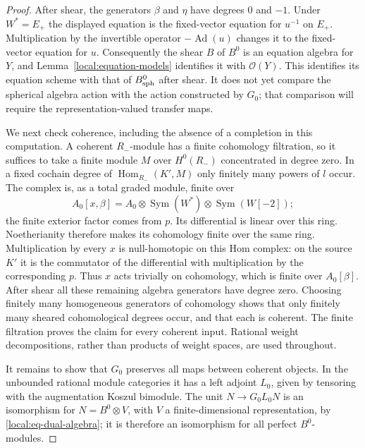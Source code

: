 \documentclass[11pt]{article}
\numberwithin{equation}{section}
\theoremstyle{definition}
\theoremstyle{remark}
\newcommand{\cO}{\mathcal O}
\newcommand{\Ad}{\operatorname{Ad}}
\newcommand{\Hom}{\operatorname{Hom}}
\newcommand{\Sym}{\operatorname{Sym}}
\begin{document}
\begin{proof}
After shear, the generators $\beta$ and $\eta$ have degrees $0$ and
$-1$.  Under $W^*=E_+$ the displayed equation is the fixed-vector
equation for $u^{-1}$ on $E_+$.  Multiplication by the invertible
operator $-\Ad(u)$ changes it to the fixed-vector equation for $u$.
Consequently the shear $B$ of $B^0$ is an equation algebra for $Y$,
and Lemma~\ref{local:equation-models} identifies it with $\cO(Y)$.
This identifies its equation scheme with that of $B_{\rm sph}^0$
after shear.  It does not yet compare the spherical algebra action
with the action constructed by $G_0$; that comparison will require
the representation-valued transfer maps.

We next check coherence, including the absence of a completion in
this computation.  A coherent $R_-$-module has a finite cohomology
filtration, so it suffices to take a finite module $M$ over
$H^0(R_-)$ concentrated in degree zero.  In a fixed cochain degree
of $\Hom_{R_-}(K',M)$ only finitely many powers of $l$ occur.
The complex is, as a total graded module, finite over
\[
 A_0[x,\beta]
 =A_0\otimes\Sym(W^*)\otimes\Sym(W[-2]);
\]
the finite exterior factor comes from $p$.  Its differential is
linear over this ring.  Noetherianity therefore makes its cohomology
finite over the same ring.  Multiplication by every $x$ is
null-homotopic on this Hom complex: on the source $K'$ it is the
commutator of the differential with multiplication by the corresponding
$p$.  Thus $x$ acts trivially on cohomology, which is finite over
$A_0[\beta]$.  After shear all these remaining algebra generators
have degree zero.  Choosing finitely many homogeneous generators of
cohomology shows that only finitely many sheared cohomological degrees
occur, and that each is coherent.  The finite filtration proves the
claim for every coherent input.  Rational weight decompositions,
rather than products of weight spaces, are used throughout.

It remains to show that $G_0$ preserves all maps between coherent
objects.  In the unbounded rational module categories it has a left
adjoint $L_0$, given by tensoring with the augmentation Koszul
bimodule.  The unit
$N\to G_0L_0N$ is an isomorphism for $N=B^0\otimes V$, with
$V$ a finite-dimensional representation, by
\eqref{local:eq-dual-algebra}; it is therefore an isomorphism for
all perfect $B^0$-modules.


\end{proof}
\end{document}
